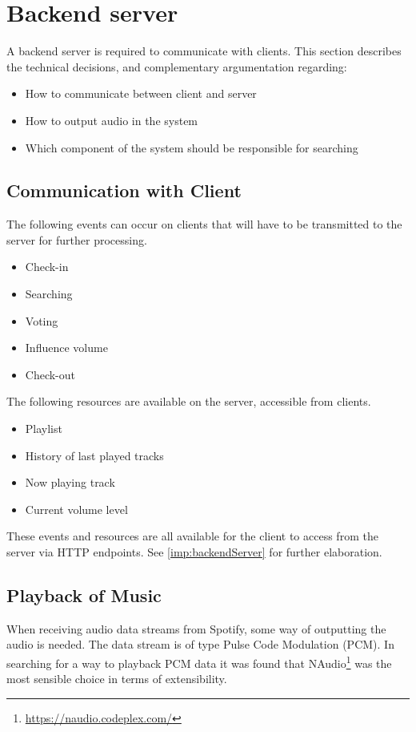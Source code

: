\section{Backend server}
\label{techPlat:backendServer}

A backend server is required to communicate with clients. This section describes the technical decisions, and complementary argumentation regarding:
\begin{itemize}
  \item How to communicate between client and server
  \item How to output audio in the system
  \item Which component of the system should be responsible for searching
\end{itemize}

\subsection{Communication with Client}
The following events can occur on clients that will have to be
transmitted to the server for further processing.

\begin{itemize}
\item Check-in
\item Searching
\item Voting
\item Influence volume
\item Check-out
\end{itemize}

The following resources are available on the server, accessible from
clients.

\begin{itemize}
\item Playlist
\item History of last played tracks
\item Now playing track
\item Current volume level
\end{itemize}

These events and resources are all available for the client to access from the server
via HTTP endpoints. See \cref{imp:backendServer} for further elaboration.

\subsection{Playback of Music}
When receiving audio data streams from Spotify, some way of outputting the audio is needed. The data stream is of type Pulse Code Modulation (PCM). In searching for a way to playback PCM data it was found that NAudio\footnote{\url{https://naudio.codeplex.com/}} was the most sensible choice in terms of extensibility.

